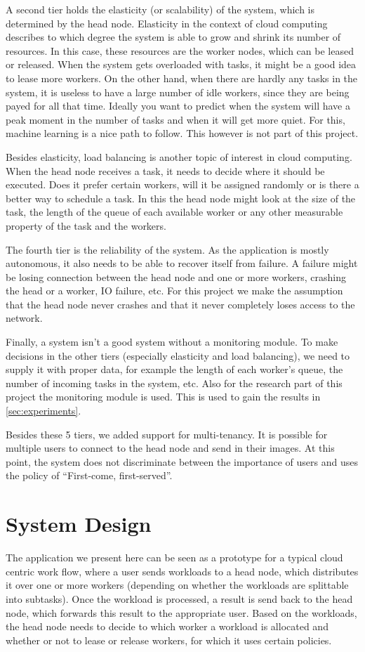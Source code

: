 \documentclass{stylesheet}
\begin{document}
A second tier holds the elasticity (or scalability) of the system, which is determined by the head node. Elasticity in the context of cloud computing describes to which degree the system is able to grow and shrink its number of resources. In this case, these resources are the worker nodes, which can be leased or released. When the system gets overloaded with tasks, it might be a good idea to lease more workers. On the other hand, when there are hardly any tasks in the system, it is useless to have a large number of idle workers, since they are being payed for all that time. Ideally you want to predict when the system will have a peak moment in the number of tasks and when it will get more quiet. For this, machine learning is a nice path to follow. This however is not part of this project.

Besides elasticity, load balancing is another topic of interest in cloud computing. When the head node receives a task, it needs to decide where it should be executed. Does it prefer certain workers, will it be assigned randomly or is there a better way to schedule a task. In this the head node might look at the size of the task, the length of the queue of each available worker or any other measurable property of the task and the workers.

The fourth tier is the reliability of the system. As the application is mostly autonomous, it also needs to be able to recover itself from failure. A failure might be losing connection between the head node and one or more workers, crashing the head or a worker, IO failure, etc. For this project we make the assumption that the head node never crashes and that it never completely loses access to the network.

Finally, a system isn't a good system without a monitoring module. To make decisions in the other tiers (especially elasticity and load balancing), we need to supply it with proper data, for example the length of each worker's queue, the number of incoming tasks in the system, etc. Also for the research part of this project the monitoring module is used. This is used to gain the results in \cref{sec:experiments}.

Besides these 5 tiers, we added support for multi-tenancy. It is possible for multiple users to connect to the head node and send in their images. At this point, the system does not discriminate between the importance of users and uses the policy of ``First-come, first-served''.

\section{System Design}
\label{sec:design}
The application we present here can be seen as a prototype for a typical cloud centric work flow, where a user sends workloads to a head node, which distributes it over one or more workers (depending on whether the workloads are splittable into subtasks). Once the workload is processed, a result is send back to the head node, which forwards this result to the appropriate user. Based on the workloads, the head node needs to decide to which worker a workload is allocated and whether or not to lease or release workers, for which it uses certain policies.
\end{document}
